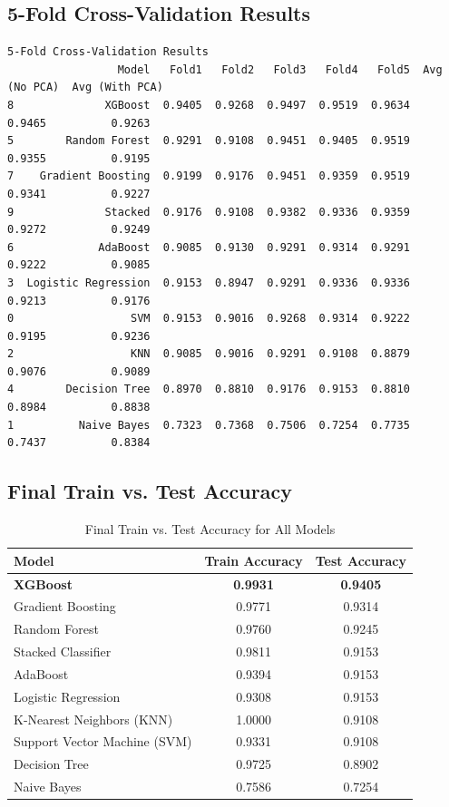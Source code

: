\documentclass[12pt]{article}
\begin{document}
\subsection{5-Fold Cross-Validation Results}
\begin{verbatim}
5-Fold Cross-Validation Results
                 Model   Fold1   Fold2   Fold3   Fold4   Fold5  Avg (No PCA)  Avg (With PCA)
8              XGBoost  0.9405  0.9268  0.9497  0.9519  0.9634        0.9465          0.9263
5        Random Forest  0.9291  0.9108  0.9451  0.9405  0.9519        0.9355          0.9195
7    Gradient Boosting  0.9199  0.9176  0.9451  0.9359  0.9519        0.9341          0.9227
9              Stacked  0.9176  0.9108  0.9382  0.9336  0.9359        0.9272          0.9249
6             AdaBoost  0.9085  0.9130  0.9291  0.9314  0.9291        0.9222          0.9085
3  Logistic Regression  0.9153  0.8947  0.9291  0.9336  0.9336        0.9213          0.9176
0                  SVM  0.9153  0.9016  0.9268  0.9314  0.9222        0.9195          0.9236
2                  KNN  0.9085  0.9016  0.9291  0.9108  0.8879        0.9076          0.9089
4        Decision Tree  0.8970  0.8810  0.9176  0.9153  0.8810        0.8984          0.8838
1          Naive Bayes  0.7323  0.7368  0.7506  0.7254  0.7735        0.7437          0.8384
\end{verbatim}

\subsection{Final Train vs. Test Accuracy}
\begin{table}[H]
\centering
\caption{Final Train vs. Test Accuracy for All Models}
\begin{tabular}{@{}lcc@{}}
\toprule
\textbf{Model} & \textbf{Train Accuracy} & \textbf{Test Accuracy} \\ \midrule
\textbf{XGBoost} & \textbf{0.9931} & \textbf{0.9405} \\
Gradient Boosting & 0.9771 & 0.9314 \\
Random Forest & 0.9760 & 0.9245 \\
Stacked Classifier & 0.9811 & 0.9153 \\
AdaBoost & 0.9394 & 0.9153 \\
Logistic Regression & 0.9308 & 0.9153 \\
K-Nearest Neighbors (KNN) & 1.0000 & 0.9108 \\
Support Vector Machine (SVM) & 0.9331 & 0.9108 \\
Decision Tree & 0.9725 & 0.8902 \\
Naive Bayes & 0.7586 & 0.7254 \\ \bottomrule
\end{tabular}
\end{table}
\end{document}
